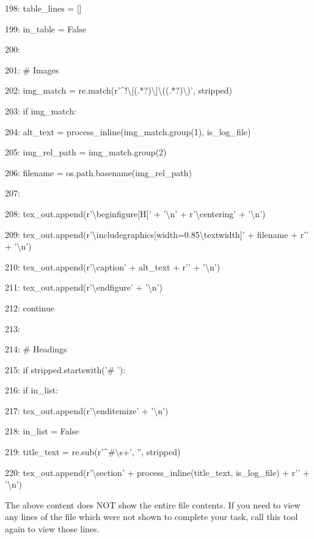 \documentclass[11pt,a4paper]{article}
\begin{document}
198:                 table\_lines = []

199:                 in\_table = False

200:

201:         \# Images

202:         img\_match = re.match(r'\textasciicircum{}!\textbackslash{}[(.*?)\textbackslash{}]\textbackslash{}((.*?)\textbackslash{})', stripped)

203:         if img\_match:

204:             alt\_text = process\_inline(img\_match.group(1), is\_log\_file)

205:             img\_rel\_path = img\_match.group(2)

206:             filename = os.path.basename(img\_rel\_path)

207:

208:             tex\_out.append(r'\textbackslash{}begin{figure}[H]' + '\textbackslash{}n' + r'\textbackslash{}centering' + '\textbackslash{}n')

209:             tex\_out.append(r'\textbackslash{}includegraphics[width=0.85\textbackslash{}textwidth]{' + filename + r'}' + '\textbackslash{}n')

210:             tex\_out.append(r'\textbackslash{}caption{' + alt\_text + r'}' + '\textbackslash{}n')

211:             tex\_out.append(r'\textbackslash{}end{figure}' + '\textbackslash{}n')

212:             continue

213:

214:         \# Headings

215:         if stripped.startswith('\# '):

216:             if in\_list:

217:                 tex\_out.append(r'\textbackslash{}end{itemize}' + '\textbackslash{}n')

218:                 in\_list = False

219:             title\_text = re.sub(r'\textasciicircum{}\#\textbackslash{}s+', '', stripped)

220:             tex\_out.append(r'\textbackslash{}section{' + process\_inline(title\_text, is\_log\_file) + r'}' + '\textbackslash{}n')

The above content does NOT show the entire file contents. If you need to view any lines of the file which were not shown to complete your task, call this tool again to view those lines.
\end{document}
